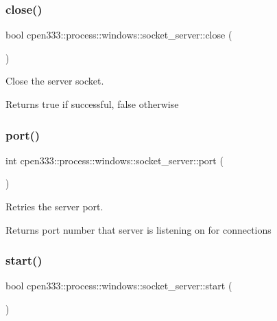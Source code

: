 \subsubsection{\texorpdfstring{close()}{close()}}
{\footnotesize\ttfamily bool cpen333\+::process\+::windows\+::socket\+\_\+server\+::close (\begin{DoxyParamCaption}{ }\end{DoxyParamCaption})\hspace{0.3cm}{\ttfamily [inline]}}



Close the server socket. 

\begin{DoxyReturn}{Returns}
true if successful, false otherwise 
\end{DoxyReturn}
\mbox{\label{classcpen333_1_1process_1_1windows_1_1socket__server_a4b5f9231c046f947a77a6458202c2712}} 
\subsubsection{\texorpdfstring{port()}{port()}}
{\footnotesize\ttfamily int cpen333\+::process\+::windows\+::socket\+\_\+server\+::port (\begin{DoxyParamCaption}{ }\end{DoxyParamCaption})\hspace{0.3cm}{\ttfamily [inline]}}



Retries the server port. 

\begin{DoxyReturn}{Returns}
port number that server is listening on for connections 
\end{DoxyReturn}
\mbox{\label{classcpen333_1_1process_1_1windows_1_1socket__server_a0a2021766c8d5728d044a96d24bbc684}} 
\subsubsection{\texorpdfstring{start()}{start()}}
{\footnotesize\ttfamily bool cpen333\+::process\+::windows\+::socket\+\_\+server\+::start (\begin{DoxyParamCaption}{ }\end{DoxyParamCaption})\hspace{0.3cm}{\ttfamily [inline]}}



